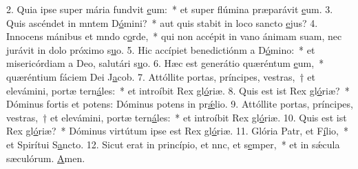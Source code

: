 2. Quia ipse super mária fundvit \uline{e}um:~* et super flúmina præparávit \uline{e}um.
3. Quis ascéndet in mntem D\uline{ó}mini?~* aut quis stabit in loco sancto \uline{e}jus?
4. Innocens mánibus et mndo c\uline{o}rde,~* qui non accépit in vano ánimam suam, nec jurávit in dolo próximo s\uline{u}o.
5. Hic accípiet benedictiónm a D\uline{ó}mino:~* et misericórdiam a Deo, salutári s\uline{u}o.
6. Hæc est generátio quæréntum \uline{e}um,~* quæréntium fáciem Dei J\uline{a}cob.
7. Attóllite portas, príncipes, vestras,~† et elevámini, portæ tern\uline{á}les:~* et introíbit Rex gl\uline{ó}riæ.
8. Quis est ist Rex gl\uline{ó}riæ?~* Dóminus fortis et potens: Dóminus potens in pr\uline{ǽ}lio.
9. Attóllite portas, príncipes, vestras,~† et elevámini, portæ tern\uline{á}les:~* et introíbit Rex gl\uline{ó}riæ.
10. Quis est ist Rex gl\uline{ó}riæ?~* Dóminus virtútum ipse est Rex gl\uline{ó}riæ.
11. Glória Patr, et F\uline{í}lio,~* et Spirítui S\uline{a}ncto.
12. Sicut erat in princípio, et nnc, et s\uline{e}mper,~* et in sǽcula sæculórum. \uline{A}men.
